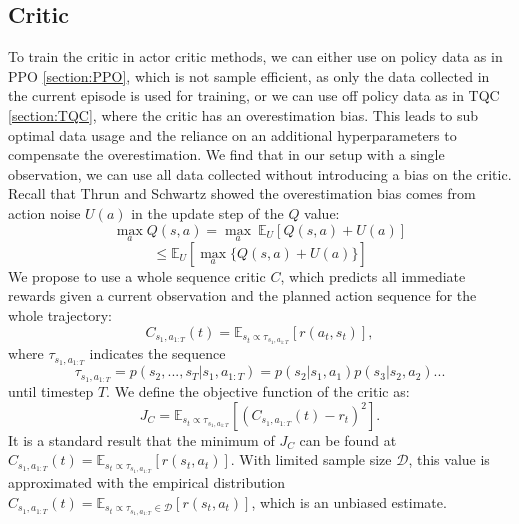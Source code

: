 \subsection{Critic}
\label{sec:AC_Critic}
To train the critic in actor critic methods, we can either use on policy data as in PPO \ref{section:PPO}, which is not sample efficient, as only the data collected 
in the current episode is used for training, or we can use off policy data as in TQC \ref{section:TQC}, where the critic has an overestimation bias. This 
leads to sub optimal data usage and the reliance on an additional hyperparameters to compensate the overestimation. We find that in our setup with a single observation, we can use all data 
collected without introducing a bias on the critic. \\
Recall that Thrun and Schwartz \cite{thrun1993issues} showed the overestimation bias comes from action noise $U(a)$ in the update step of the $Q$ value:
\begin{equation*}
    \max_{a}Q(s,a) = \max_{a}\ \mathbb{E}_U \left[Q(s,a) + U(a)\right]
\end{equation*}
\begin{equation}
    \leq \mathbb{E}_U \left[\max_a \{Q(s,a) + U(a)\}\right]
\end{equation}
We propose to use a whole sequence critic $C$, which predicts all immediate rewards given a current observation 
and the planned action sequence for the whole trajectory:
\begin{equation}
    \label{eq:emp_mean_c}
    C_{s_1, a_{1:T}}(t) = \mathbb{E}_{s_t \propto \tau_{s_1, a_{1:T}}}\left[r(a_t, s_t)\right],
\end{equation}
where $\tau_{s_1, a_{1:T}}$ indicates the sequence 
$$\tau_{s_1, a_{1:T}} = p(s_2, ..., s_T|s_1, a_{1:T}) = p(s_2|s_1, a_1) p(s_3|s_2,a_2)...$$
 until timestep $T$. 
We define the objective function of the critic as:
\begin{equation}
    J_C = \mathbb{E}_{s_t \propto \tau_{s_1, a_{1:T}}}\left[(C_{s_1, a_{1:T}}(t) - r_t)^2\right].
\end{equation}
It is a standard result that the minimum of $J_C$ can be found at $C_{s_1, a_{1:T}}(t) = \mathbb{E}_{s_t \propto \tau_{s_1, a_{1:T}}}\left[r(s_t, a_t)\right]$. 
With limited sample size $\mathcal{D}$, this value is approximated with the empirical distribution $C_{s_1, a_{1:T}}(t) = \mathbb{E}_{s_t \propto \tau_{s_1, a_{1:T}} \in \mathcal{D}}\left[r(s_t, a_t)\right]$, 
which is an unbiased estimate.\\


